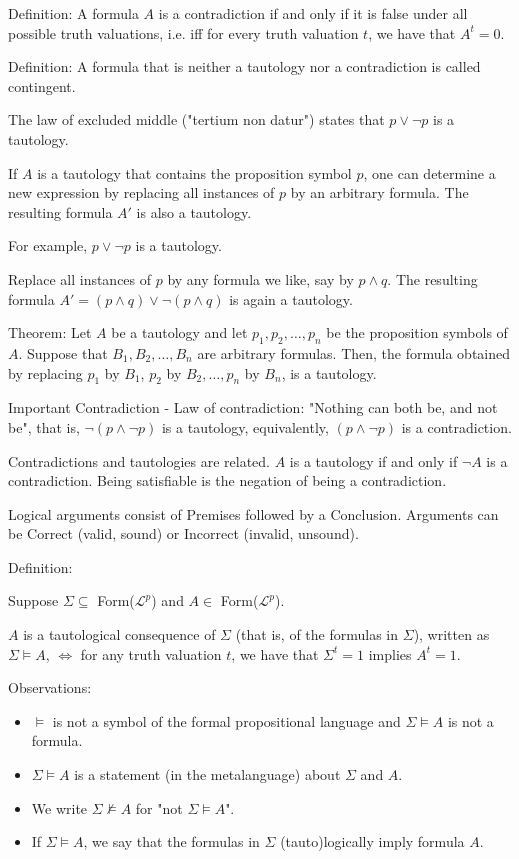 \documentclass{article}
\begin{document}
Definition: A formula $A$ is a contradiction if and only if it is false under all possible truth valuations, i.e. iff for every truth valuation $t$, we have that $A^t = 0$. 

Definition: A formula that is neither a tautology nor a contradiction is called contingent. 


The law of excluded middle ("tertium non datur") states that $p \vee \neg p$ is a tautology. 

If $A$ is a tautology that contains the proposition symbol $p$, one can determine a new expression by replacing all instances of $p$ by an arbitrary formula. The resulting formula $A'$ is also a tautology. 

For example, $p \vee \neg p$ is a tautology. 

Replace all instances of $p$ by any formula we like, say by $p \wedge q$. The resulting formula $A' = (p \wedge q) \vee \neg(p \wedge q)$ is again a tautology. 

Theorem: Let $A$ be a tautology and let $p_1, p_2, \ldots, p_n$ be the proposition symbols of $A$. Suppose that $B_1, B_2, \ldots, B_n$ are arbitrary formulas. Then, the formula obtained by replacing $p_1$ by $B_1$, $p_2$ by $B_2, \ldots, p_n$ by $B_n$, is a tautology. 

Important Contradiction - Law of contradiction: "Nothing can both be, and not be", that is, $\neg (p \wedge \neg p)$ is a tautology, equivalently, $(p \wedge \neg p)$ is a contradiction. 

Contradictions and tautologies are related. $A$ is a tautology if and only if $\neg A$ is a contradiction. Being satisfiable is the negation of being a contradiction. 

Logical arguments consist of Premises followed by a Conclusion. Arguments can be Correct (valid, sound) or Incorrect (invalid, unsound). 

Definition:

Suppose $\Sigma \subseteq$ Form($\mathcal{L}^p$) and $A \in $ Form($\mathcal{L}^p$). 

$A$ is a tautological consequence of $\Sigma$ (that is, of the formulas in $\Sigma$), written as $\Sigma \vDash A$, $\iff$ for any truth valuation $t$, we have that $\Sigma^t = 1$ implies $A^t = 1$. 

Observations:
\begin{itemize}
    \item $\vDash$ is not a symbol of the formal propositional language and $\Sigma \vDash A$ is not a formula. 
    \item $\Sigma \vDash A$ is a statement (in the metalanguage) about $\Sigma$ and $A$. 
    \item We write $\Sigma \not\vDash A$ for "not $\Sigma \vDash A$".
    \item If $\Sigma \vDash A$, we say that the formulas in $\Sigma$ (tauto)logically imply formula $A$. 
\end{itemize}
\end{document}
